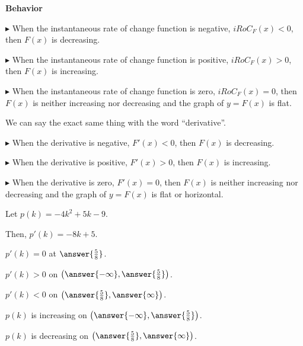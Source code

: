 \documentclass{ximera}
\begin{document}
\begin{conclusion}  \textbf{\textcolor{green!25!black}{Behavior}}

$\blacktriangleright$ When the instantaneous rate of change function is negative, $iRoC_F(x) < 0$, then $F(x)$ is decreasing.

$\blacktriangleright$ When the instantaneous rate of change function is positive, $iRoC_F(x) > 0$, then $F(x)$ is increasing. 

$\blacktriangleright$ When the instantaneous rate of change function is zero, $iRoC_F(x) = 0$, then $F(x)$ is neither increasing nor decreasing and the graph of $y = F(x)$ is flat. 


We can say the exact same thing with the word ``derivative''. 



$\blacktriangleright$ When the derivative is negative, $F'(x) < 0$, then $F(x)$ is decreasing. 

$\blacktriangleright$ When the derivative is positive, $F'(x) > 0$, then $F(x)$ is increasing. 

$\blacktriangleright$ When the derivative is zero, $F'(x) = 0$, then $F(x)$ is neither increasing nor decreasing and the graph of $y = F(x)$ is flat or horizontal. 



\end{conclusion}




\begin{question} 



Let $p(k) = -4 k^2 + 5 k - 9$.

Then, $p'(k) = -8 k + 5$.

$p'(k) = 0$ at $\answer{\frac{5}{8}}$.

$p'(k) > 0$ on $\left( \answer{-\infty}  , \answer{\frac{5}{8}}  \right)$.

$p'(k) < 0$ on $\left( \answer{\frac{5}{8}} , \answer{\infty} \right)$.

$p(k)$ is increasing on $\left( \answer{-\infty}  , \answer{\frac{5}{8}}  \right)$.

$p(k)$ is decreasing on $\left( \answer{\frac{5}{8}} , \answer{\infty} \right)$.

\end{question}
\end{document}
